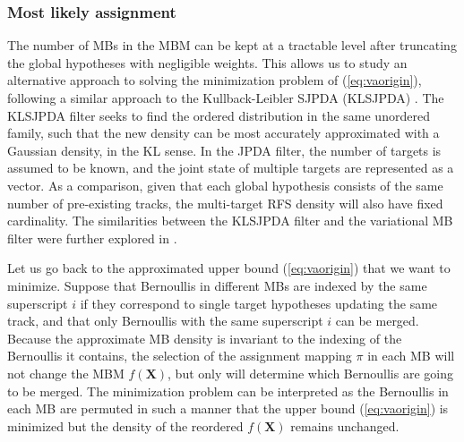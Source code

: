 \documentclass[journal]{IEEEtran}
\begin{document}





\subsubsection{Most likely assignment}

The number of MBs in the MBM can be kept at a tractable level after truncating the global hypotheses with negligible weights. This allows us to study an alternative approach to solving the minimization problem of (\ref{eq:vaorigin}), following a similar approach to the Kullback-Leibler SJPDA (KLSJPDA) \cite{sjpda}. The KLSJPDA filter seeks to find the ordered distribution in the same unordered family, such that the new density can be most accurately approximated with a Gaussian density, in the KL sense. In the JPDA filter, the number of targets is assumed to be known, and the joint state of multiple targets are represented as a vector. As a comparison, given that each global hypothesis consists of the same number of pre-existing tracks, the multi-target RFS density will also have fixed cardinality. The similarities between the KLSJPDA filter and the variational MB filter were further explored in \cite{variational}.

Let us go back to the approximated upper bound (\ref{eq:vaorigin}) that we want to minimize. Suppose that Bernoullis in different MBs are indexed by the same superscript $i$ if they correspond to single target hypotheses updating the same track, and that only Bernoullis with the same superscript $i$ can be merged. Because the approximate MB density is invariant to the indexing of the Bernoullis it contains, the selection of the assignment mapping $\pi$ in each MB will not change the MBM $f(\mathbf{X})$, but only will determine which Bernoullis are going to be merged. The minimization problem can be interpreted as the Bernoullis in each MB are permuted in such a manner that the upper bound (\ref{eq:vaorigin}) is minimized but the density of the reordered $f(\mathbf{X})$ remains unchanged. 
\end{document}
